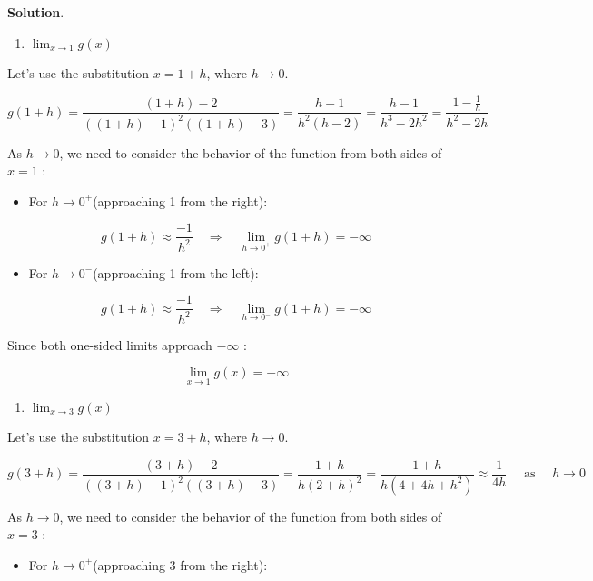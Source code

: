 \documentclass[
]{book}
\providecommand{\tightlist}{%
  \setlength{\itemsep}{0pt}\setlength{\parskip}{0pt}}
\theoremstyle{definition}
\theoremstyle{definition}
\theoremstyle{definition}
\theoremstyle{definition}
\theoremstyle{remark}
\begin{document}
\textbf{Solution}.

\begin{enumerate}
\def\labelenumi{\alph{enumi}.}
\tightlist
\item
  \(\lim _{x \rightarrow 1} g(x)\)
\end{enumerate}

Let's use the substitution \(x=1+h\), where \(h \rightarrow 0\).

\[
g(1+h)=\frac{(1+h)-2}{((1+h)-1)^{2}((1+h)-3)}=\frac{h-1}{h^{2}(h-2)}=\frac{h-1}{h^{3}-2 h^{2}}=\frac{1-\frac{1}{h}}{h^{2}-2 h}
\]

As \(h \rightarrow 0\), we need to consider the behavior of the function from both sides of \(x=1\) :

\begin{itemize}
\tightlist
\item
  For \(h \rightarrow 0^{+}\)(approaching 1 from the right):
\end{itemize}

\[
g(1+h) \approx \frac{-1}{h^{2}} \quad \Rightarrow \quad \lim _{h \rightarrow 0^{+}} g(1+h)=-\infty
\]

\begin{itemize}
\tightlist
\item
  For \(h \rightarrow 0^{-}\)(approaching 1 from the left):
\end{itemize}

\[
g(1+h) \approx \frac{-1}{h^{2}} \quad \Rightarrow \quad \lim _{h \rightarrow 0^{-}} g(1+h)=-\infty
\]

Since both one-sided limits approach \(-\infty\) :

\[
\lim _{x \rightarrow 1} g(x)=-\infty
\]

\begin{enumerate}
\def\labelenumi{\alph{enumi}.}
\setcounter{enumi}{1}
\tightlist
\item
  \(\lim _{x \rightarrow 3} g(x)\)
\end{enumerate}

Let's use the substitution \(x=3+h\), where \(h \rightarrow 0\).

\[
g(3+h)=\frac{(3+h)-2}{((3+h)-1)^{2}((3+h)-3)}=\frac{1+h}{h(2+h)^{2}}=\frac{1+h}{h\left(4+4 h+h^{2}\right)} \approx \frac{1}{4 h} \quad \text { as } \quad h \rightarrow 0
\]

As \(h \rightarrow 0\), we need to consider the behavior of the function from both sides of \(x=3\) :

\begin{itemize}
\tightlist
\item
  For \(h \rightarrow 0^{+}\)(approaching 3 from the right):
\end{itemize}
\end{document}
